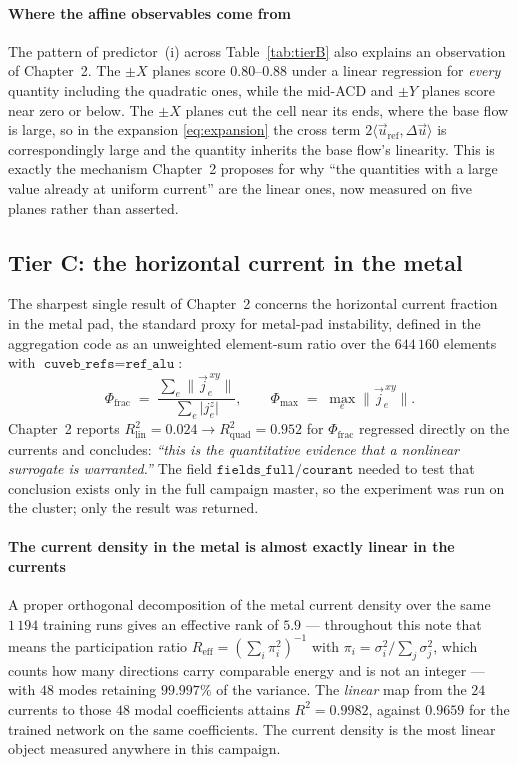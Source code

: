 \documentclass[11pt,a4paper]{article}
\theoremstyle{plain}
\theoremstyle{definition}
\theoremstyle{remark}
\begin{document}
\paragraph{Where the affine observables come from}
The pattern of predictor~(i) across Table~\ref{tab:tierB} also explains an
observation of Chapter~2. The $\pm X$ planes score $0.80$--$0.88$ under a linear
regression for \emph{every} quantity including the quadratic ones, while the
mid-ACD and $\pm Y$ planes score near zero or below. The $\pm X$ planes cut the
cell near its ends, where the base flow is large, so in the expansion
\eqref{eq:expansion} the cross term $2\langle\vec{u}_{\mathrm{ref}},\Delta\vec{u}\rangle$
is correspondingly large and the quantity inherits the base flow's linearity.
This is exactly the mechanism Chapter~2 proposes for why ``the quantities with a
large value already at uniform current'' are the linear ones, now measured on
five planes rather than asserted.

\subsection{Tier C: the horizontal current in the metal}
\label{sec:tierC}
\label{sec:tierC}

The sharpest single result of Chapter~2 concerns the horizontal current fraction
in the metal pad, the standard proxy for metal-pad instability, defined in the
aggregation code as an unweighted element-sum ratio over the $644\,160$ elements
with $\texttt{cuveb\_refs} = \texttt{ref\_alu}$:
\begin{equation}
\label{eq:jfrac}
\Phi_{\mathrm{frac}} \;=\;
\frac{\sum_e \bigl\|\vec{j}_{e}^{\,xy}\bigr\|}{\sum_e \bigl|j_{e}^{z}\bigr|},
\qquad
\Phi_{\max} \;=\; \max_e \bigl\|\vec{j}_{e}^{\,xy}\bigr\| .
\end{equation}
Chapter~2 reports $R^2_{\mathrm{lin}} = 0.024 \to R^2_{\mathrm{quad}} = 0.952$
for $\Phi_{\mathrm{frac}}$ regressed directly on the currents and concludes:
\emph{``this is the quantitative evidence that a nonlinear surrogate is
warranted.''} The field $\texttt{fields\_full/courant}$ needed to test that
conclusion exists only in the full campaign master, so the experiment was run on the
cluster; only the result was returned.

\label{meas:j-linear}
\paragraph{The current density in the metal is almost exactly linear in the currents}
A proper orthogonal decomposition of the metal current density over the same
$1\,194$ training runs gives an effective rank of $5.9$ --- throughout this note
that means the participation ratio
$R_{\mathrm{eff}} = (\sum_i \pi_i^2)^{-1}$ with
$\pi_i = \sigma_i^2/\sum_j\sigma_j^2$, which counts how many directions carry
comparable energy and is not an integer --- with $48$ modes
retaining $99.997\%$ of the variance. The \emph{linear} map from the $24$
currents to those $48$ modal coefficients attains $R^2 = 0.9982$, against
$0.9659$ for the trained network on the same coefficients. The current density
is the most linear object measured anywhere in this campaign.
\end{document}
